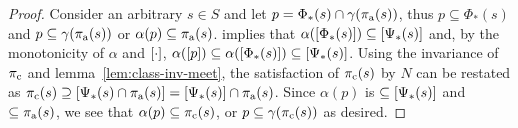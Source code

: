 \begin{proof}
Consider an arbitrary $s \in S$ and let $p = \Phi_{*}(s) \cap \gamma(\operatorname{\pi_{\textrm{a}}}(s))$, thus $p \subseteq \Phi_{*}(s)$ and $p \subseteq \gamma(\operatorname{\pi_{\textrm{a}}}(s))$ or $\alpha(p) \subseteq \operatorname{\pi_{\textrm{a}}}(s)$.  implies that $\alpha([\Phi_{*}(s)]) \subseteq [\Psi_{*}(s)]$ and, by the monotonicity of $\alpha$ and $[\cdot]$, $\alpha([p]) \subseteq \alpha([\Phi_{*}(s)]) \subseteq [\Psi_{*}(s)]$. Using the invariance of $\operatorname{\pi_{\textrm{c}}}$ and lemma~\ref{lem:class-inv-meet}, the satisfaction of $\operatorname{\pi_{\textrm{c}}}(s)$ by $N$ can be restated as $\operatorname{\pi_{\textrm{c}}}(s) \supseteq [\Psi_{*}(s) \cap \operatorname{\pi_{\textrm{a}}}(s)] = [\Psi_{*}(s)] \cap \operatorname{\pi_{\textrm{a}}}(s)$. Since $\alpha(p)$ is $\subseteq [\Psi_{*}(s)]$ and $\subseteq \operatorname{\pi_{\textrm{a}}}(s)$, we see that $\alpha(p) \subseteq \operatorname{\pi_{\textrm{c}}}(s)$, or $p \subseteq \gamma(\operatorname{\pi_{\textrm{c}}}(s))$ as desired.
\end{proof}





